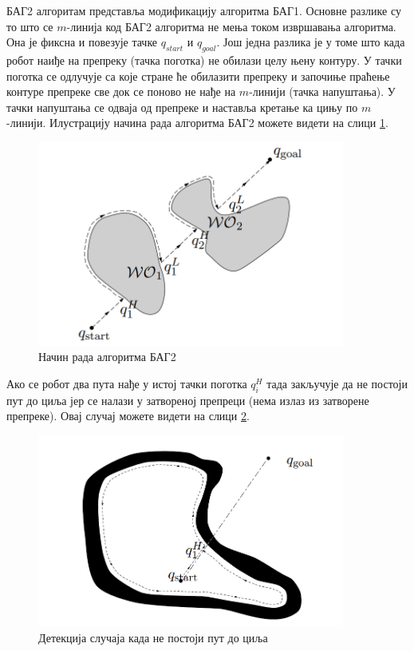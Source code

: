 \documentclass[12pt,oneside]{memoir}
\theoremstyle{remark}
\begin{document}
БАГ2 алгоритам представља модификацију алгоритма БАГ1. Основне разлике су то што се $m$-линија код БАГ2 алгоритма не мења током извршавања алгоритма. Она је фиксна и повезује тачке $q_{start}$ и $q_{goal}$. Још једна разлика је у томе што када робот наиђе на препреку (тачка поготка) не обилази целу њену контуру. У тачки поготка се одлучује са које стране ће обилазити препреку и започиње праћење контуре препреке све док се поново не нађе на $m$-линији (тачка напуштања). У тачки напуштања се одваја од препреке и наставља кретање ка цињу по $m$-линији. Илустрацију начина рада алгоритма БАГ2 можете видети на слици \ref{fig:bug2}.
\begin{figure}[!ht]
\centering
\includegraphics[width=0.9\textwidth]{slike/bug2.png}
\caption{Начин рада алгоритма БАГ2}
\label{fig:bug2}
\end{figure}
Ако се робот два пута нађе у истој тачки поготка $q_i^H$ тада закључује да не постоји пут до циља јер се налази у затвореној препреци (нема излаз из затворене препреке). Овај случај можете видети на слици \ref{fig:bug2f}.

\begin{figure}[!ht]
\centering
\includegraphics[width=0.9\textwidth]{slike/bug2f.png}
\caption{Детекција случаја када не постоји пут до циља}
\label{fig:bug2f}
\end{figure}
\end{document}
